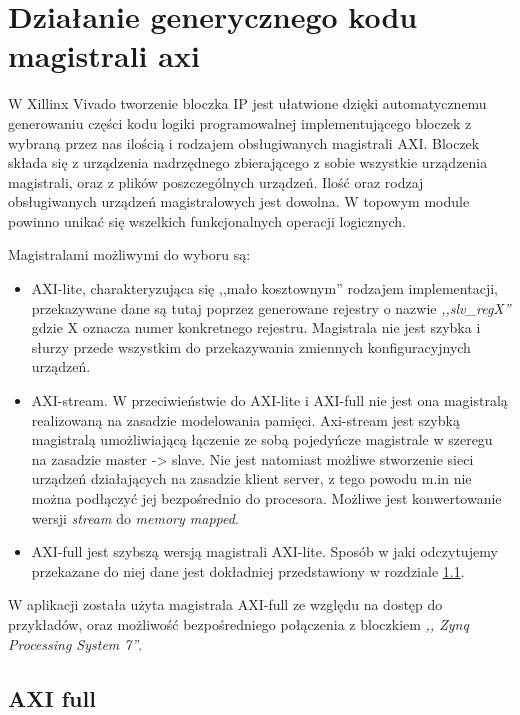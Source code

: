 \section{Działanie generycznego kodu magistrali axi}
\label{sec:logika:magistrala}

W Xillinx Vivado tworzenie bloczka IP jest ułatwione dzięki automatycznemu generowaniu
części kodu logiki programowalnej implementującego bloczek z wybraną przez nas
ilością i rodzajem obsługiwanych magistrali AXI. Bloczek składa się z urządzenia
nadrzędnego zbierającego z sobie wszystkie urządzenia magistrali, oraz z plików poszczególnych
urządzeń. Ilość oraz rodzaj obsługiwanych urządzeń magistralowych jest dowolna.
W topowym module powinno unikać się wszelkich funkcjonalnych operacji logicznych.

Magistralami możliwymi do wyboru są:
\begin{itemize}
\item AXI-lite, charakteryzująca się ,,mało kosztownym'' rodzajem implementacji,
    przekazywane dane są tutaj poprzez generowane rejestry o nazwie \textit{,,slv\_regX''}
    gdzie X oznacza numer konkretnego rejestru. Magistrala nie jest szybka i słurzy przede wszystkim
    do przekazywania zmiennych konfiguracyjnych urządzeń.
\item AXI-stream. W przeciwieństwie do AXI-lite i AXI-full nie jest ona magistralą
    realizowaną na zasadzie modelowania pamięci. Axi-stream jest szybką magistralą
    umożliwiającą łączenie ze sobą pojedyńcze magistrale w szeregu na zasadzie
    master -> slave. Nie jest natomiast możliwe stworzenie sieci urządzeń działających na zasadzie
    klient server, z tego powodu m.in nie można podłączyć jej bezpośrednio do procesora.
    Możliwe jest konwertowanie wersji \textit{stream} do \textit{memory mapped}.
\item AXI-full jest szybszą wersją magistrali AXI-lite. Sposób w jaki odczytujemy przekazane
    do niej dane jest dokładniej przedstawiony w rozdziale \ref{sec:logika:magistrala:full}.
\end{itemize}

W aplikacji została użyta magistrala AXI-full ze względu na dostęp do przykładów,
  oraz możliwość bezpośredniego połączenia z bloczkiem \textit{,, Zynq Processing System 7''}.

\subsection{AXI full}
\label{sec:logika:magistrala:full}


